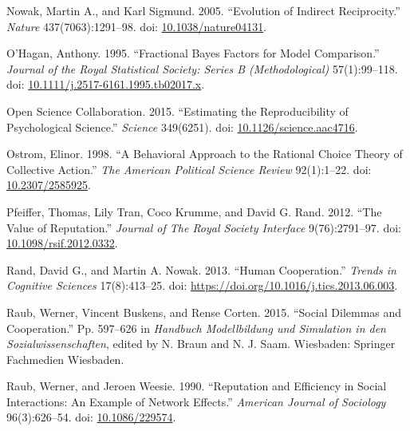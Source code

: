 \documentclass[
  11pt,
]{article}
\newlength{\cslhangindent}
\newlength{\cslentryspacingunit} %
\newenvironment{CSLReferences}[2] %
 {%
  \setlength{\parindent}{0pt}
  \ifodd #1
  \let\oldpar\par
  \def\par{\hangindent=\cslhangindent\oldpar}
  \fi
  \setlength{\parskip}{#2\cslentryspacingunit}
 }%
 {}
\begin{document}
\begin{CSLReferences}{1}{0}
\leavevmode{}%
Nowak, Martin A., and Karl Sigmund. 2005. {``Evolution of Indirect Reciprocity.''} \emph{Nature} 437(7063):1291--98. doi: \href{https://doi.org/10.1038/nature04131}{10.1038/nature04131}.

\leavevmode{}%
O'Hagan, Anthony. 1995. {``Fractional Bayes Factors for Model Comparison.''} \emph{Journal of the Royal Statistical Society: Series B (Methodological)} 57(1):99--118. doi: \href{https://doi.org/10.1111/j.2517-6161.1995.tb02017.x}{10.1111/j.2517-6161.1995.tb02017.x}.

\leavevmode{}%
Open Science Collaboration. 2015. {``Estimating the Reproducibility of Psychological Science.''} \emph{Science} 349(6251). doi: \href{https://doi.org/10.1126/science.aac4716}{10.1126/science.aac4716}.

\leavevmode{}%
Ostrom, Elinor. 1998. {``A Behavioral Approach to the Rational Choice Theory of Collective Action.''} \emph{The American Political Science Review} 92(1):1--22. doi: \href{https://doi.org/10.2307/2585925}{10.2307/2585925}.

\leavevmode{}%
Pfeiffer, Thomas, Lily Tran, Coco Krumme, and David G. Rand. 2012. {``The Value of Reputation.''} \emph{Journal of The Royal Society Interface} 9(76):2791--97. doi: \href{https://doi.org/10.1098/rsif.2012.0332}{10.1098/rsif.2012.0332}.

\leavevmode{}%
Rand, David G., and Martin A. Nowak. 2013. {``Human Cooperation.''} \emph{Trends in Cognitive Sciences} 17(8):413--25. doi: \url{https://doi.org/10.1016/j.tics.2013.06.003}.

\leavevmode{}%
Raub, Werner, Vincent Buskens, and Rense Corten. 2015. {``Social Dilemmas and Cooperation.''} Pp. 597--626 in \emph{Handbuch {M}odellbildung und {S}imulation in den {S}ozialwissenschaften}, edited by N. Braun and N. J. Saam. Wiesbaden: Springer Fachmedien Wiesbaden.

\leavevmode{}%
Raub, Werner, and Jeroen Weesie. 1990. {``Reputation and Efficiency in Social Interactions: An Example of Network Effects.''} \emph{American Journal of Sociology} 96(3):626--54. doi: \href{https://doi.org/10.1086/229574}{10.1086/229574}.


\end{CSLReferences}
\end{document}
